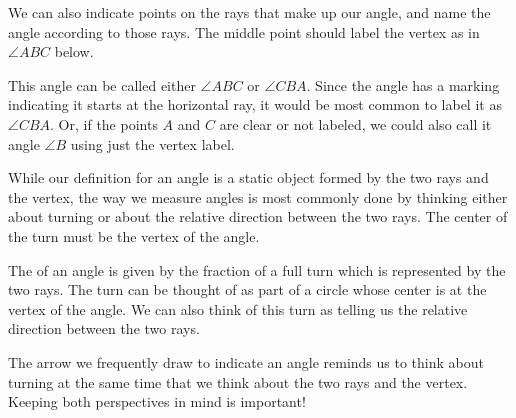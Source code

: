 \documentclass{ximera}
\begin{document}
%
%
%
%

We can also indicate points on the rays that make up our angle, and name the angle according to those rays. The middle point should label the vertex as in $\angle ABC$ below.
\begin{image}
\end{image}
This angle can be called either $\angle ABC$ or $\angle CBA$. Since the angle has a marking indicating it starts at the horizontal ray, it would be most common to label it as $\angle CBA$. Or, if the points $A$ and $C$ are clear or not labeled, we could also call it angle $\angle B$ using just the vertex label.

While our definition for an angle is a static object formed by the two rays and the vertex, the way we measure angles is most commonly done by thinking either about turning or about the relative direction between the two rays. The center of the turn must be the vertex of the angle.

\begin{definition}
The  of an angle is given by the fraction of a full turn which is represented by the two rays. The turn can be thought of as part of a circle whose center is at the vertex of the angle. We can also think of this turn as telling us the relative direction between the two rays.
\end{definition} 

The arrow we frequently draw to indicate an angle reminds us to think about turning at the same time that we think about the two rays and the vertex. Keeping both perspectives in mind is important!
\end{document}
